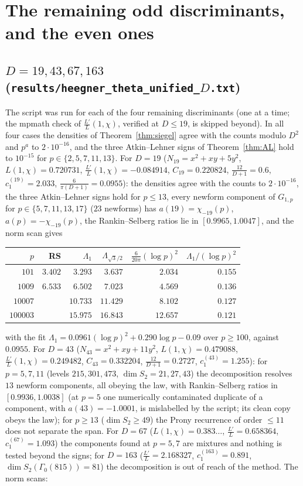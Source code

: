 \documentclass[11pt]{amsart}
\theoremstyle{remark}
\begin{document}
\section{The remaining odd discriminants, and the even ones}
\subsection{$D=19,43,67,163$ (\texttt{results/heegner\_theta\_unified\_}$D$\texttt{.txt})}
The script was run for each of the four remaining discriminants (one at a time; the mpmath check of $\frac{L'}L(1,\chi)$, verified at $D\le19$, is skipped beyond). In all four cases the densities of Theorem~\ref{thm:siegel} agree with the counts modulo $D^2$ and $p^a$ to $2\cdot10^{-16}$, and the three Atkin--Lehner signs of Theorem~\ref{thm:AL} hold to $10^{-15}$ for $p\in\{2,5,7,11,13\}$. For $D=19$ ($N_{19}=x^2+xy+5y^2$, $L(1,\chi)=0.720731$, $\frac{L'}L(1,\chi)=-0.084914$, $C_{19}=0.220824$, $\frac{12}{D+1}=0.6$, $c_1^{(19)}=2.033$, $\frac6{\pi(D+1)}=0.0955$): the densities agree with the counts to $2\cdot10^{-16}$, the three Atkin--Lehner signs hold for $p\le13$, every newform component of $G_{1,p}$ for $p\in\{5,7,11,13,17\}$ ($23$ newforms) has $a(19)=\chi_{-19}(p)$, $a(p)=-\chi_{-19}(p)$, the Rankin--Selberg ratios lie in $[0.9965,1.0047]$, and the norm scan gives
\begin{center}\footnotesize
\begin{tabular}{r|rrr|rr}
\toprule
$p$ & RS & $\Lambda_1$ & $\Lambda_{\sqrt3/2}$ & $\frac6{20\pi}(\log p)^2$ & $\Lambda_1/(\log p)^2$\\
\midrule
$101$ & $3.402$ & $3.293$ & $3.637$ & $2.034$ & $0.155$\\
$1009$ & $6.533$ & $6.502$ & $7.023$ & $4.569$ & $0.136$\\
$10007$ & & $10.733$ & $11.429$ & $8.102$ & $0.127$\\
$100003$ & & $15.975$ & $16.843$ & $12.657$ & $0.121$\\
\bottomrule
\end{tabular}
\end{center}
with the fit $\Lambda_1=0.0961(\log p)^2+0.290\log p-0.09$ over $p\ge100$, against $0.0955$. For $D=43$ ($N_{43}=x^2+xy+11y^2$, $L(1,\chi)=0.479088$, $\frac{L'}L(1,\chi)=0.249482$, $C_{43}=0.332204$, $\frac{12}{D+1}=0.2727$, $c_1^{(43)}=1.255$): for $p=5,7,11$ (levels $215,301,473$, $\dim S_2=21,27,43$) the decomposition resolves $13$ newform components, all obeying the law, with Rankin--Selberg ratios in $[0.9936,1.0038]$ (at $p=5$ one numerically contaminated duplicate of a component, with $a(43)=-1.0001$, is mislabelled by the script; its clean copy obeys the law); for $p\ge13$ ($\dim S_2\ge49$) the Prony recurrence of order $\le11$ does not separate the span. For $D=67$ ($L(1,\chi)=0.383\ldots$, $\frac{L'}L=0.658364$, $c_1^{(67)}=1.093$) the components found at $p=5,7$ are mixtures and nothing is tested beyond the signs; for $D=163$ ($\frac{L'}L=2.168327$, $c_1^{(163)}=0.891$, $\dim S_2(\Gamma_0(815))=81$) the decomposition is out of reach of the method. The norm scans:
\end{document}
